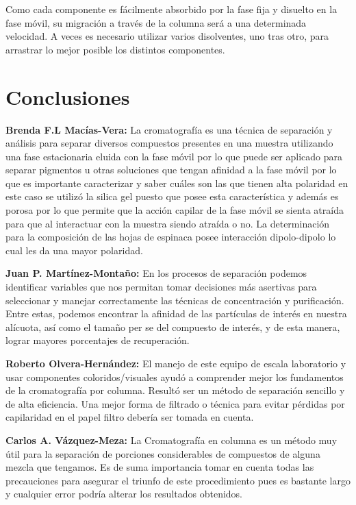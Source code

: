 \documentclass{ITESO-Report}
\begin{document}
Como cada componente es fácilmente absorbido por la fase fija y disuelto en la fase móvil, su migración a través de la columna será a una determinada velocidad. A veces es necesario utilizar varios disolventes, uno tras otro, para arrastrar lo mejor posible los distintos componentes.


\section{Conclusiones}

{\color{darkgray}\bfseries Brenda F.L Macías-Vera:}\hspace{1em}
La cromatografía es una técnica de separación y análisis para separar diversos compuestos presentes en una muestra utilizando una fase estacionaria eluida con la fase móvil por lo que puede ser aplicado para separar pigmentos u otras soluciones que tengan afinidad a la fase móvil por lo que es importante caracterizar y saber cuáles son las que tienen alta polaridad en este caso se utilizó la silica gel puesto que posee esta característica y además es porosa por lo que permite que la acción capilar de la fase móvil se sienta atraída para que al interactuar con la muestra siendo atraída o no. La determinación para la composición de las hojas de espinaca posee interacción dipolo-dipolo lo cual les da una mayor polaridad.

{\color{darkgray}\bfseries Juan P. Martínez-Montaño:}\hspace{1em}
En los procesos de separación podemos identificar variables que nos permitan tomar decisiones más asertivas para seleccionar y manejar correctamente las técnicas de concentración y purificación. Entre estas, podemos encontrar la afinidad de las partículas de interés en nuestra alícuota, así como el tamaño per se del compuesto de interés, y de esta manera, lograr mayores porcentajes de recuperación. 

{\color{darkgray}\bfseries Roberto Olvera-Hernández:}\hspace{1em}
El manejo de este equipo de escala laboratorio y usar componentes coloridos/visuales ayudó a comprender mejor los fundamentos de la cromatografía por columna. Resultó ser un método de separación sencillo y de alta eficiencia. Una mejor forma de filtrado o técnica para evitar pérdidas por capilaridad en el papel filtro debería ser tomada en cuenta.

{\color{darkgray}\bfseries Carlos A. Vázquez-Meza:}\hspace{1em}
La Cromatografía en columna es un método muy útil para la separación de porciones considerables de compuestos de alguna mezcla que tengamos. Es de suma importancia tomar en cuenta todas las precauciones para asegurar el triunfo de este procedimiento pues es bastante largo y cualquier error podría alterar los resultados obtenidos.
\end{document}
